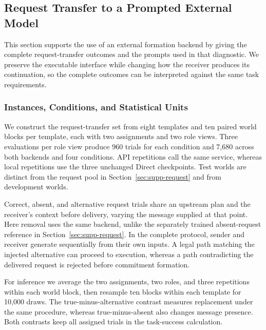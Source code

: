 \documentclass[sigconf,nonacm,balance=false]{aamas}
\begin{document}
\subsection{Request Transfer to a Prompted External Model}
\label{sec:supp-api}

This section supports the use of an external formation backend by giving the complete request-transfer outcomes and the prompts used in that diagnostic. We preserve the executable interface while changing how the receiver produces its continuation, so the complete outcomes can be interpreted against the same task requirements.

\subsubsection{Instances, Conditions, and Statistical Units}

We construct the request-transfer set from eight templates and ten paired world blocks per template, each with two assignments and two role views. Three evaluations per role view produce 960 trials for each condition and 7,680 across both backends and four conditions. API repetitions call the same service, whereas local repetitions use the three unchanged Direct checkpoints. Test worlds are distinct from the request pool in Section~\ref{sec:supp-request} and from development worlds.

Correct, absent, and alternative request trials share an upstream plan and the receiver's context before delivery, varying the message supplied at that point. Here removal uses the same backend, unlike the separately trained absent-request reference in Section~\ref{sec:supp-request}. In the complete protocol, sender and receiver generate sequentially from their own inputs. A legal path matching the injected alternative can proceed to execution, whereas a path contradicting the delivered request is rejected before commitment formation.

For inference we average the two assignments, two roles, and three repetitions within each world block, then resample ten blocks within each template for 10,000 draws. The true-minus-alternative contrast measures replacement under the same procedure, whereas true-minus-absent also changes message presence. Both contrasts keep all assigned trials in the task-success calculation.
\end{document}
